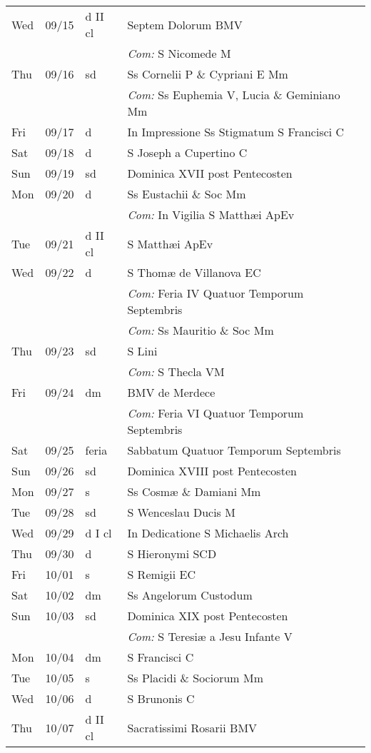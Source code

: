 \documentclass[10pt]{article}
\begin{document}
\begin{longtable}{ l l l l }
Wed & 09/15 & d II cl & Septem Dolorum BMV\\
 & & & \textit{Com:} S Nicomede M\\
Thu & 09/16 & sd & Ss Cornelii P \& Cypriani E Mm\\
 & & & \textit{Com:} Ss Euphemia V, Lucia \& Geminiano Mm\\
Fri & 09/17 & d & In Impressione Ss Stigmatum S Francisci C\\
Sat & 09/18 & d & S Joseph a Cupertino C\\
Sun & 09/19 & sd & Dominica XVII post Pentecosten\\
Mon & 09/20 & d & Ss Eustachii \& Soc Mm\\
 & & & \textit{Com:} In Vigilia S Matthæi ApEv\\
Tue & 09/21 & d II cl & S Matthæi ApEv\\
Wed & 09/22 & d & S Thomæ de Villanova EC\\
 & & & \textit{Com:} Feria IV Quatuor Temporum Septembris\\
 & & & \textit{Com:} Ss Mauritio \& Soc Mm\\
Thu & 09/23 & sd & S Lini\\
 & & & \textit{Com:} S Thecla VM\\
Fri & 09/24 & dm & BMV de Merdece\\
 & & & \textit{Com:} Feria VI Quatuor Temporum Septembris\\
Sat & 09/25 & feria & Sabbatum Quatuor Temporum Septembris\\
Sun & 09/26 & sd & Dominica XVIII post Pentecosten\\
Mon & 09/27 & s & Ss Cosmæ \& Damiani Mm\\
Tue & 09/28 & sd & S Wenceslau Ducis M\\
Wed & 09/29 & d I cl & In Dedicatione S Michaelis Arch\\
Thu & 09/30 & d & S Hieronymi SCD\\
Fri & 10/01 & s & S Remigii EC\\
Sat & 10/02 & dm & Ss Angelorum Custodum\\
Sun & 10/03 & sd & Dominica XIX post Pentecosten\\
 & & & \textit{Com:} S Teresiæ a Jesu Infante V\\
Mon & 10/04 & dm & S Francisci C\\
Tue & 10/05 & s & Ss Placidi \& Sociorum Mm\\
Wed & 10/06 & d & S Brunonis C\\
Thu & 10/07 & d II cl & Sacratissimi Rosarii BMV\\

\end{longtable}
\end{document}
